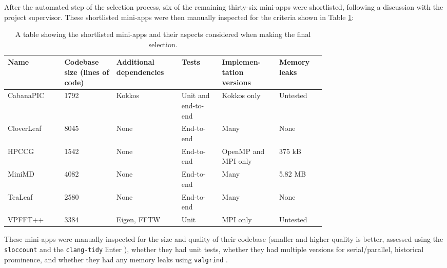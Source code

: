 After the automated step of the selection process, six of the remaining thirty-six mini-apps were shortlisted, following a discussion with the project supervisor. These shortlisted mini-apps were then manually inspected for the criteria shown in Table \ref{table:miniapps}:

\begin{table}[H]
\centering
    \caption{A table showing the shortlisted mini-apps and their aspects considered when making the final selection.}
    \label{table:miniapps}
    \begin{tabular}{|p{0.14\linewidth}|p{0.125\linewidth}|p{0.12\linewidth}|p{0.1025\linewidth}|p{0.135\linewidth}|p{0.1\linewidth}|}
    \hline
    Name       & Codebase size (lines of code) & Additional dependencies & Tests               & Implemen-tation versions & Memory leaks \\ \hline\hline
    CabanaPIC \cite{ECPcopaCabanaPIC2023} & \cellcolor{green!25}1792 & \cellcolor{red!25}Kokkos & \cellcolor{green!25}Unit and end-to-end & \cellcolor{orange!25}Kokkos only & \cellcolor{red!25}Untested     \\ \hline
    CloverLeaf \cite{CloverLeaf} & \cellcolor{red!25}8045 & \cellcolor{green!25}None & \cellcolor{orange!25}End-to-end & \cellcolor{green!25}Many & \cellcolor{orange!25}None         \\ \hline
    HPCCG \cite{herouxHPCCGSolverPackage2007} & \cellcolor{green!25}1542 & \cellcolor{green!25}None & \cellcolor{orange!25}End-to-end & \cellcolor{orange!25}OpenMP and MPI only & \cellcolor{green!25}375 kB       \\ \hline
    MiniMD \cite{osti_1231191} & \cellcolor{orange!25}4082 & \cellcolor{green!25}None & \cellcolor{orange!25}End-to-end & \cellcolor{green!25}Many & \cellcolor{green!25}5.82 MB      \\ \hline
    TeaLeaf \cite{TeaLeaf2023} & \cellcolor{orange!25}2580 & \cellcolor{green!25}None & \cellcolor{orange!25}End-to-end & \cellcolor{green!25}Many & \cellcolor{orange!25}None         \\ \hline
    VPFFT++ \cite{VPFFT2023}   & \cellcolor{orange!25}3384 & \cellcolor{red!25}Eigen, FFTW & \cellcolor{orange!25}Unit & \cellcolor{orange!25}MPI only & \cellcolor{red!25}Untested     \\ \hline
    \end{tabular}
\end{table}

These mini-apps were manually inspected for the size and quality of their codebase (smaller and higher quality is better, assessed using the \texttt{sloccount} \cite{SLOCCount} and the \texttt{clang-tidy} linter \cite{ClangTidyExtraClang}), whether they had unit tests, whether they had multiple versions for serial/parallel, historical prominence, and whether they had any memory leaks using \texttt{valgrind} \cite{ValgrindHome}.

